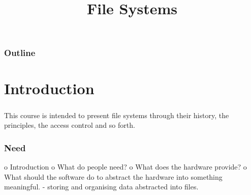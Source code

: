 %
%
%
%
%
%

%
%

%
%

\def\path{../../../..}

%
%



%
%

\title{File Systems}

%
%



%
%

\begin{frame}
  \titlepage
\end{frame}

%
%

\begin{frame}
  \frametitle{Outline}

  \tableofcontents
\end{frame}

%
%

%
%

\section{Introduction}


\begin{frame}
  \frametitle{}

  This course is intended to present file systems through their history,
  the principles, the access control and so forth.
\end{frame}


\begin{frame}
  \frametitle{Need}

  
\end{frame}

o Introduction
 o What do people need?
 o What does the hardware provide?
 o What should the software do to abstract the hardware into something meaningful.
   - storing and organising data abstracted into files.

